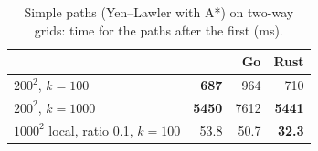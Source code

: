 \begin{table}[t]
\centering
\caption{Simple paths (Yen--Lawler with A*) on two-way grids: time for the paths after the first (ms).}
\label{tab:yen}
\small
\begin{tabular}{lrrr}
\toprule
 & \cs{} & Go & Rust \\
\midrule
$200^2$, $k=100$ & \textbf{\num{687}} & \num{964} & \num{710} \\
$200^2$, $k=1000$ & \textbf{\num{5450}} & \num{7612} & \textbf{\num{5441}} \\
$1000^2$ local, ratio 0.1, $k=100$ & 53.8 & 50.7 & \textbf{32.3} \\
\bottomrule
\end{tabular}
\end{table}

